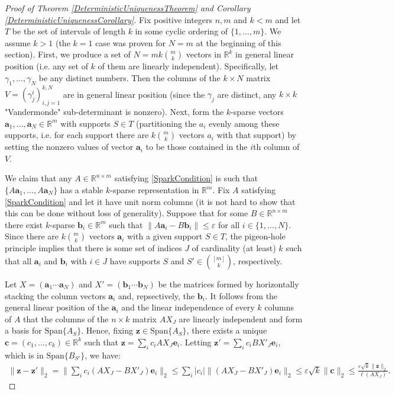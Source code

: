 \documentclass[journal, onecolumn]{IEEEtran}
\begin{document}
\begin{proof}[Proof of Theorem \ref{DeterministicUniquenessTheorem} and Corollary \ref{DeterministicUniquenessCorollary}]
Fix positive integers $n, m$ and $k < m$ and let $T$ be the set of intervals of length $k$ in some cyclic ordering of $\{1, \ldots, m\}$. We assume $k > 1$ (the $k=1$ case was proven for $N=m$ at the beginning of this section). First, we produce a set of $N = mk{m \choose k}$ vectors in $\mathbb{R}^k$ in general linear position (i.e. any set of $k$ of them are linearly independent). Specifically, let $\gamma_1, ..., \gamma_N$ be any distinct numbers. Then the columns of the $k \times N$ matrix $V = (\gamma^i_j)^{k,N}_{i,j=1}$ are in general linear position (since the $\gamma_j$ are distinct, any $k \times k$ "Vandermonde" sub-determinant is nonzero). Next, form the $k$-sparse vectors $\mathbf{a}_1, \ldots, \mathbf{a}_N \in \mathbb{R}^m$ with supports $S \in T$ (partitioning the $a_i$ evenly among these supports, i.e. for each support there are $k{m \choose k}$ vectors $a_i$ with that support) by setting the nonzero values of vector $\mathbf{a}_i$ to be those contained in the $i$th column of $V$.

We claim that any $A \in \mathbb{R}^{n \times m}$ satisfying \eqref{SparkCondition} is such that $\{A\mathbf{a}_1, \ldots, A\mathbf{a}_N\}$ has a stable $k$-sparse representation in $\mathbb{R}^m$. Fix $A$ satisfying \eqref{SparkCondition} and let it have unit norm columns (it is not hard to show that this can be done without loss of generality). Suppose that for some $B \in \mathbb{R}^{n \times m}$ there exist $k$-sparse $\mathbf{b}_i \in \mathbb{R}^m$ such that $\|A\mathbf{a}_i - B\mathbf{b}_i\| \leq \varepsilon$ for all $i \in \{1, \ldots, N\}$. Since there are $k{m \choose k}$ vectors $\mathbf{a}_i$ with a given support $S \in T$, the pigeon-hole principle implies that there is some set of indices $J$ of cardinality (at least) $k$ such that all $\mathbf{a}_i$ and $\mathbf{b}_i$ with $i \in J$ have supports $S$ and $S' \in {[m] \choose k}$, respectively.

Let $X = (\mathbf{a}_1 \cdots \mathbf{a}_N)$ and $X' = (\mathbf{b}_1 \cdots \mathbf{b}_N)$ be the matrices formed by horizontally stacking the column vectors $\mathbf{a}_i$ and, repsectively, the $\mathbf{b}_i$. It follows from the general linear position of the $\mathbf{a}_i$ and the linear independence of every $k$ columns of $A$ that the columns of the $n \times k$ matrix $AX_J$ are linearly independent and form a basis for $\text{Span}\{A_{S}\}$. Hence, fixing $\mathbf{z} \in \text{Span}\{A_{S}\}$, there exists a unique $\mathbf{c} = (c_1, \ldots, c_k) \in \mathbb{R}^k$ such that $\mathbf{z} = \sum_i c_iAX_J\mathbf{e}_i$. Letting $\mathbf{z'} = \sum_i c_iBX'_J\mathbf{e}_i$, which is in $\text{Span}\{B_{S'}\}$, we have:
\begin{align*}
\|\mathbf{z} - \mathbf{z'}\|_2 = \|\sum_ic_i(AX_J - BX'_J)\mathbf{e}_i\|_2 
\leq \sum_i |c_i| \|(AX_J - BX'_J)\mathbf{e}_i\|_2  
\leq \varepsilon \sqrt{k} \|\mathbf{c}\|_2 
\leq \frac{\varepsilon \sqrt{k} \|\mathbf{z}\|_2}{\ell(AX_J)}.
\end{align*}


\end{proof}
\end{document}
